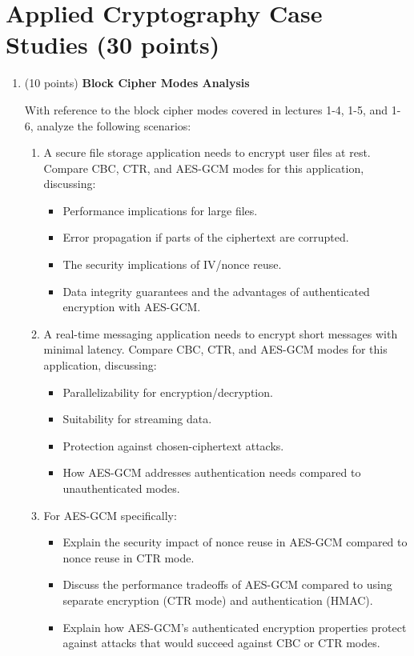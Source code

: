 \documentclass[10pt,a4paper,american]{exam}
\begin{document}
\section{Applied Cryptography Case Studies (30 points)}

\begin{enumerate}
	\item (10 points) \textbf{Block Cipher Modes Analysis}

	      With reference to the block cipher modes covered in lectures 1-4, 1-5, and 1-6, analyze the following scenarios:
	      \begin{enumerate}
		      \item A secure file storage application needs to encrypt user files at rest. Compare CBC, CTR, and AES-GCM modes for this application, discussing:
		            \begin{itemize}
			            \item Performance implications for large files.
			            \item Error propagation if parts of the ciphertext are corrupted.
			            \item The security implications of IV/nonce reuse.
			            \item Data integrity guarantees and the advantages of authenticated encryption with AES-GCM.
		            \end{itemize}
		      \item A real-time messaging application needs to encrypt short messages with minimal latency. Compare CBC, CTR, and AES-GCM modes for this application, discussing:
		            \begin{itemize}
			            \item Parallelizability for encryption/decryption.
			            \item Suitability for streaming data.
			            \item Protection against chosen-ciphertext attacks.
			            \item How AES-GCM addresses authentication needs compared to unauthenticated modes.
		            \end{itemize}
		      \item For AES-GCM specifically:
		            \begin{itemize}
			            \item Explain the security impact of nonce reuse in AES-GCM compared to nonce reuse in CTR mode.
			            \item Discuss the performance tradeoffs of AES-GCM compared to using separate encryption (CTR mode) and authentication (HMAC).
			            \item Explain how AES-GCM's authenticated encryption properties protect against attacks that would succeed against CBC or CTR modes.
		            \end{itemize}
	      \end{enumerate}


\end{enumerate}
\end{document}
